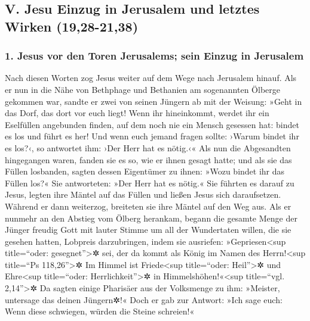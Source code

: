 \hypertarget{v.-jesu-einzug-in-jerusalem-und-letztes-wirken-1928-2138}{%
\subsection{V. Jesu Einzug in Jerusalem und letztes Wirken
(19,28-21,38)}\label{v.-jesu-einzug-in-jerusalem-und-letztes-wirken-1928-2138}}

\hypertarget{jesus-vor-den-toren-jerusalems-sein-einzug-in-jerusalem}{%
\subsubsection{1. Jesus vor den Toren Jerusalems; sein Einzug in
Jerusalem}\label{jesus-vor-den-toren-jerusalems-sein-einzug-in-jerusalem}}

 Nach diesen Worten zog Jesus weiter auf dem Wege nach
Jerusalem hinauf.  Als er nun in die Nähe von Bethphage
und Bethanien am sogenannten Ölberge gekommen war, sandte er zwei von
seinen Jüngern ab  mit der Weisung: »Geht in das Dorf,
das dort vor euch liegt! Wenn ihr hineinkommt, werdet ihr ein Eselfüllen
angebunden finden, auf dem noch nie ein Mensch gesessen hat: bindet es
los und führt es her!  Und wenn euch jemand fragen
sollte: ›Warum bindet ihr es los?‹, so antwortet ihm: ›Der Herr hat es
nötig.‹«  Als nun die Abgesandten hingegangen waren,
fanden sie es so, wie er ihnen gesagt hatte;  und als sie
das Füllen losbanden, sagten dessen Eigentümer zu ihnen: »Wozu bindet
ihr das Füllen los?«  Sie antworteten: »Der Herr hat es
nötig.«  Sie führten es darauf zu Jesus, legten ihre
Mäntel auf das Füllen und ließen Jesus sich daraufsetzen.
 Während er dann weiterzog, breiteten sie ihre Mäntel auf
den Weg aus.  Als er nunmehr an den Abstieg vom Ölberg
herankam, begann die gesamte Menge der Jünger freudig Gott mit lauter
Stimme um all der Wundertaten willen, die sie gesehen hatten, Lobpreis
darzubringen,  indem sie ausriefen:
»Gepriesen\textless sup title=``oder: gesegnet''\textgreater✲ sei, der
da kommt als König im Namen des Herrn!\textless sup title=``Ps
118,26''\textgreater✲ Im Himmel ist Friede\textless sup title=``oder:
Heil''\textgreater✲ und Ehre\textless sup title=``oder:
Herrlichkeit''\textgreater✲ in Himmelshöhen!«\textless sup title=``vgl.
2,14''\textgreater✲  Da sagten einige Pharisäer aus der
Volksmenge zu ihm: »Meister, untersage das deinen Jüngern✲!«
 Doch er gab zur Antwort: »Ich sage euch: Wenn diese
schwiegen, würden die Steine schreien!«

